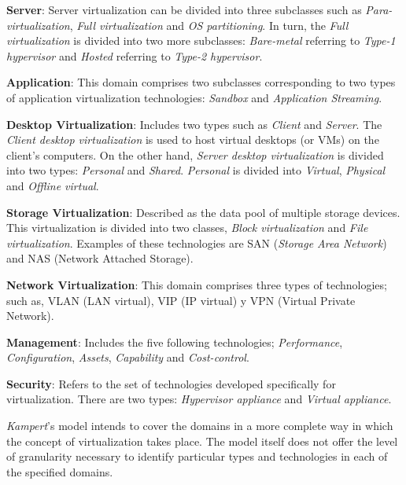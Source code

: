 	\textbf{Server}:  Server virtualization can be divided into three subclasses such as \textit{Para-virtualization}, \textit{Full virtualization} and \textit{OS partitioning}. In turn, the \textit{Full virtualization} is divided into two more subclasses: \textit{Bare-metal} referring to \textit {Type-1 hypervisor} and \textit{Hosted} referring to \textit {Type-2 hypervisor}.
		
	\textbf {Application}: This domain comprises two subclasses corresponding to two types of application virtualization technologies: \textit{Sandbox} and \textit{Application Streaming}.
		
	\textbf{Desktop Virtualization}: Includes two types such as \textit{Client} and \textit{Server}. The \textit{Client desktop virtualization} is used to host virtual desktops (or VMs) on the client's computers. On the other hand, \textit{Server desktop virtualization} is divided into two types: \textit{Personal} and \textit{Shared}. \textit{Personal} is divided into \textit{Virtual}, \textit{Physical} and \textit{Offline virtual}.
		
	\textbf {Storage Virtualization}: Described as the data pool of multiple storage devices. This virtualization is divided into two classes,  \textit {Block virtualization} and \textit {File virtualization}. Examples of these technologies are SAN (\textit{Storage Area Network}) and NAS (Network Attached Storage).
		
	\textbf{Network Virtualization}: This domain comprises three types of technologies; such as, VLAN (LAN virtual), VIP (IP virtual) y VPN (Virtual Private Network).
		
    \textbf{Management}: Includes the five following technologies;  \textit{Performance}, \textit{Configuration}, \textit{Assets}, \textit{Capability} and \textit {Cost-control}.
		
	\textbf {Security}: Refers to the set of technologies developed specifically for virtualization. There are two types: \textit{Hypervisor appliance} and \textit{Virtual appliance}.
		
	\textit{Kampert}'s model intends to cover the domains in a more complete way in which the concept of virtualization takes place. The model itself does not offer the level of granularity necessary to identify particular types and technologies in each of the specified domains.
